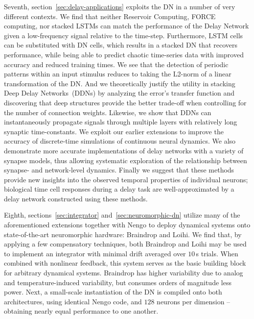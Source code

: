 Seventh, section~\ref{sec:delay-applications} exploits the DN in a number of very different contexts.
We find that neither Reservoir Computing, FORCE computing, nor stacked LSTMs can match the performance of the Delay Network given a low-frequency signal relative to the time-step.
Furthermore, LSTM cells can be substituted with DN cells, which results in a stacked DN that recovers performance, while being able to predict chaotic time-series data with improved accuracy and reduced training times.
We see that the detection of periodic patterns within an input stimulus reduces to taking the L2-norm of a linear transformation of the DN.
And we theoretically justify the utility in stacking Deep Delay Networks~(DDNs) by analyzing the error's transfer function and discovering that deep structures provide the better trade-off when controlling for the number of connection weights.
Likewise, we show that DDNs can instantaneously propagate signals through multiple layers with relatively long synaptic time-constants.
We exploit our earlier extensions to improve the accuracy of discrete-time simulations of continuous neural dynamics.
We also demonstrate more accurate implementations of delay networks with a variety of synapse models, thus allowing systematic exploration of the relationship between synapse- and network-level dynamics.
Finally we suggest that these methods provide new insights into the observed temporal properties of individual neurons; biological time cell responses during a delay task are well-approximated by a delay network constructed using these methods.

Eighth, sections~\ref{sec:integrator} and~\ref{sec:neuromorphic-dn} utilize many of the aforementioned extensions together with Nengo to deploy dynamical systems onto state-of-the-art neuromorphic hardware: Braindrop and Loihi.
We find that, by applying a few compensatory techniques, both Braindrop and Loihi may be used to implement an integrator with minimal drift averaged over $10$\,s trials.
When combined with nonlinear feedback, this system serves as the basic building block for arbitrary dynamical systems.
Braindrop has higher variability due to analog and temperature-induced variability, but consumes orders of magnitude less power.
Next, a small-scale instantiation of the DN is compiled onto both architectures, using identical Nengo code, and $128$ neurons per dimension -- obtaining nearly equal performance to one another.

